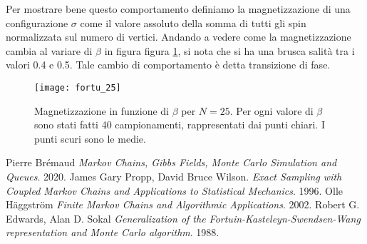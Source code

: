 \documentclass[]{marticle}
\begin{document}
Per mostrare bene questo comportamento definiamo la magnetizzazione di una
configurazione $\sigma$ come il valore assoluto della somma di tutti gli spin
normalizzata sul numero di vertici. Andando a vedere come la magnetizzazione
cambia al variare di $\beta$ in figura figura \ref{fig:plot4}, si nota che si ha
una brusca salit\`a tra i valori 0.4 e 0.5. Tale cambio di comportamento \`e
detta transizione di fase. 

\begin{figure}[]
\texttt{[image: fortu\_25]}
\caption{Magnetizzazione in funzione di $\beta$ per $N=25$. Per ogni valore di
    $\beta$ sono stati fatti 40 campionamenti, rappresentati dai punti chiari. I
    punti scuri sono le medie.}
\label{fig:plot4}
\centering
\end{figure}

\begin{thebibliography}{9}
Pierre Br\'emaud
\textit{Markov Chains, Gibbs Fields, Monte Carlo Simulation and Queues}. 
2020.
James Gary Propp, David Bruce Wilson.
\textit{Exact Sampling with Coupled Markov Chains and Applications to Statistical
        Mechanics}. 
1996.
Olle H\"aggstr\"om
\textit{Finite Markov Chains and Algorithmic Applications}. 
2002.
Robert G. Edwards, Alan D. Sokal
\textit{Generalization of the Fortuin-Kasteleyn-Swendsen-Wang representation and
        Monte Carlo algorithm}. 
1988.
\end{thebibliography}
\end{document}
